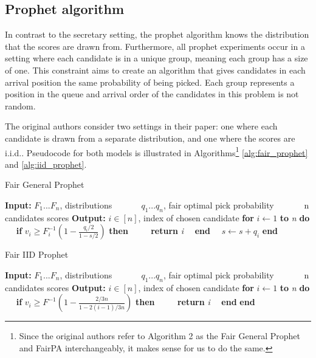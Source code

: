 \subsection{Prophet algorithm}
In contrast to the secretary setting, the prophet algorithm knows the distribution that the scores are drawn from. Furthermore, all prophet experiments occur in a setting where each candidate is in a unique group, meaning each group has a size of one. This constraint aims to create an algorithm that gives candidates in each arrival position the same probability of being picked. Each group represents a position in the queue and arrival order of the candidates in this problem is not random.

The original authors consider two settings in their paper: one where each candidate is drawn from a separate distribution, and one where the scores are i.i.d.. Pseudocode for both models is illustrated in Algorithms\footnote{Since the original authors refer to Algorithm 2  as the Fair General Prophet and FairPA interchangeably, it makes sense for us to do the same.} \ref{alg:fair_prophet} and \ref{alg:iid_prophet}.

\begin{minipage}[t]{0.46\textwidth}
\begin{algorithm}[H]
    \centering
   \caption{Fair General Prophet}\label{alg:fair_prophet}
\begin{algorithmic}
\State \textbf{Input: }$F_1 ... F_n$, distributions
\State $\qquad \>\>\>\>\> q_1 ... q_n$, fair optimal pick probability
\State $\qquad \>\>\>\>$ n candidates scores
\State \textbf{Output: }$i \in [n]$, index of chosen candidate
\State \textbf{for} $i \leftarrow 1$ \textbf{to} \textit{n} \textbf{do}
\State $\quad$ \textbf{if} $v_{i} \geq F_{i}^{-1} \left (1 - \frac{q_{i} / 2}{1-s / 2}\right)$ \textbf{then}
\State $\qquad$ \textbf{return} \textit{i}
\State $\quad$\textbf{end}
\State $\quad s \leftarrow s+q_{i}$
\State \textbf{end}
\end{algorithmic}
\end{algorithm}
\end{minipage}
\hfill
\begin{minipage}[t]{0.46\textwidth}
\begin{algorithm}[H]
    \centering
  \caption{Fair IID Prophet}\label{alg:iid_prophet}
\begin{algorithmic}
\State \textbf{Input: }$F_1 ... F_n$, distributions
\State $\qquad \>\>\>\>\> q_1 ... q_n$, fair optimal pick probability
\State $\qquad \>\>\>\>$ n candidates scores
\State \textbf{Output: }$i \in [n]$, index of chosen candidate
\State \textbf{for} $i \leftarrow 1$ \textbf{to} \textit{n} \textbf{do}
\State $\quad$ \textbf{if} $v_{i} \geq F^{-1}\left(1-\frac{2 / 3 n}{1-2(i-1) / 3 n}\right)$ \textbf{then}
\State $\qquad$ \textbf{return} \textit{i}
\State $\quad$\textbf{end}
\State \textbf{end}
\State
\end{algorithmic}
\end{algorithm}
\end{minipage}

